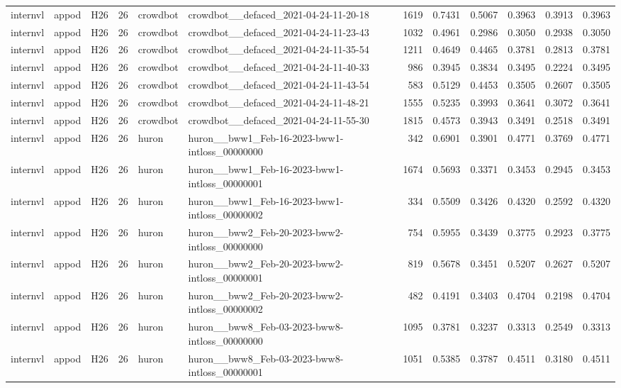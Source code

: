 \begin{table}[tbp]
\begin{tabular}{lllrllrrrrrr}
internvl & appod & H26 & 26 & crowdbot & crowdbot\_\_defaced\_2021-04-24-11-20-18 & 1619 & 0.7431 & 0.5067 & 0.3963 & 0.3913 & 0.3963 \\
internvl & appod & H26 & 26 & crowdbot & crowdbot\_\_defaced\_2021-04-24-11-23-43 & 1032 & 0.4961 & 0.2986 & 0.3050 & 0.2938 & 0.3050 \\
internvl & appod & H26 & 26 & crowdbot & crowdbot\_\_defaced\_2021-04-24-11-35-54 & 1211 & 0.4649 & 0.4465 & 0.3781 & 0.2813 & 0.3781 \\
internvl & appod & H26 & 26 & crowdbot & crowdbot\_\_defaced\_2021-04-24-11-40-33 & 986 & 0.3945 & 0.3834 & 0.3495 & 0.2224 & 0.3495 \\
internvl & appod & H26 & 26 & crowdbot & crowdbot\_\_defaced\_2021-04-24-11-43-54 & 583 & 0.5129 & 0.4453 & 0.3505 & 0.2607 & 0.3505 \\
internvl & appod & H26 & 26 & crowdbot & crowdbot\_\_defaced\_2021-04-24-11-48-21 & 1555 & 0.5235 & 0.3993 & 0.3641 & 0.3072 & 0.3641 \\
internvl & appod & H26 & 26 & crowdbot & crowdbot\_\_defaced\_2021-04-24-11-55-30 & 1815 & 0.4573 & 0.3943 & 0.3491 & 0.2518 & 0.3491 \\
internvl & appod & H26 & 26 & huron & huron\_\_bww1\_Feb-16-2023-bww1-intloss\_00000000 & 342 & 0.6901 & 0.3901 & 0.4771 & 0.3769 & 0.4771 \\
internvl & appod & H26 & 26 & huron & huron\_\_bww1\_Feb-16-2023-bww1-intloss\_00000001 & 1674 & 0.5693 & 0.3371 & 0.3453 & 0.2945 & 0.3453 \\
internvl & appod & H26 & 26 & huron & huron\_\_bww1\_Feb-16-2023-bww1-intloss\_00000002 & 334 & 0.5509 & 0.3426 & 0.4320 & 0.2592 & 0.4320 \\
internvl & appod & H26 & 26 & huron & huron\_\_bww2\_Feb-20-2023-bww2-intloss\_00000000 & 754 & 0.5955 & 0.3439 & 0.3775 & 0.2923 & 0.3775 \\
internvl & appod & H26 & 26 & huron & huron\_\_bww2\_Feb-20-2023-bww2-intloss\_00000001 & 819 & 0.5678 & 0.3451 & 0.5207 & 0.2627 & 0.5207 \\
internvl & appod & H26 & 26 & huron & huron\_\_bww2\_Feb-20-2023-bww2-intloss\_00000002 & 482 & 0.4191 & 0.3403 & 0.4704 & 0.2198 & 0.4704 \\
internvl & appod & H26 & 26 & huron & huron\_\_bww8\_Feb-03-2023-bww8-intloss\_00000000 & 1095 & 0.3781 & 0.3237 & 0.3313 & 0.2549 & 0.3313 \\
internvl & appod & H26 & 26 & huron & huron\_\_bww8\_Feb-03-2023-bww8-intloss\_00000001 & 1051 & 0.5385 & 0.3787 & 0.4511 & 0.3180 & 0.4511 \\

\end{tabular}
\end{table}
